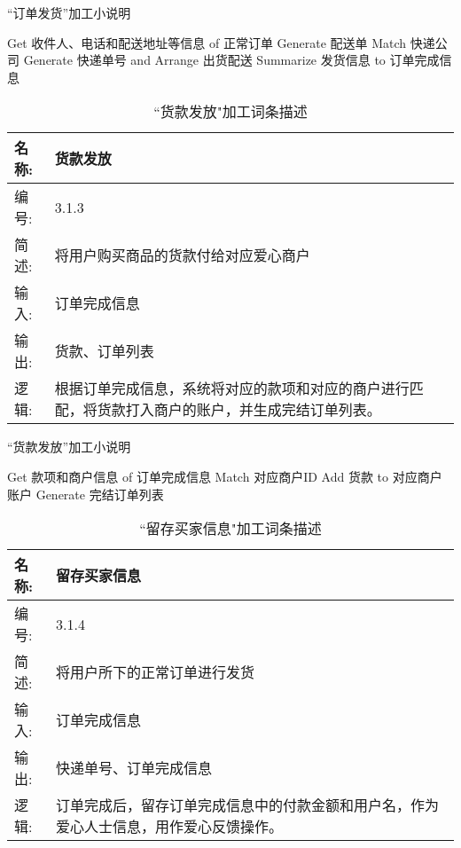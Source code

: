 \begin{algorithm}[H]
    \renewcommand{\thealgorithm}{}
    \caption{“订单发货”加工小说明} 
    \label{alg3} 
    \begin{algorithmic}[1] 
        \STATE Get 收件人、电话和配送地址等信息 of 正常订单
        \STATE Generate 配送单
        \STATE Match 快递公司
        \STATE Generate 快递单号 and Arrange 出货配送
        \STATE Summarize 发货信息 to 订单完成信息 
    \end{algorithmic} 
\end{algorithm}

\begin{table}[H]  
\caption{``货款发放"加工词条描述}  
\begin{center}  
    \begin{tabular}{l p{11cm}} 
        \hline
        \quad 名称:  &   货款发放 \\
        \hline
        \quad 编号:  & 3.1.3 \\
        \hline
        \quad 简述:  & 将用户购买商品的货款付给对应爱心商户 \\
        \hline
        \quad 输入:  & 订单完成信息 \\
        \hline
        \quad 输出:  & 货款、订单列表 \\
        \hline
        \quad 逻辑:  & 根据订单完成信息，系统将对应的款项和对应的商户进行匹配，将货款打入商户的账户，并生成完结订单列表。 \\
        \hline
    \end{tabular}
    \label{tab1}
\end{center}
\end{table}


\begin{algorithm}[H]
    \renewcommand{\thealgorithm}{}
    \caption{“货款发放”加工小说明} 
    \label{alg3} 
    \begin{algorithmic}[1] 
        \STATE Get 款项和商户信息 of 订单完成信息
        \STATE Match 对应商户ID
        \STATE Add 货款 to 对应商户账户
        \STATE Generate 完结订单列表
    \end{algorithmic} 
\end{algorithm}

\begin{table}[H]  
\caption{``留存买家信息"加工词条描述}  
\begin{center}  
    \begin{tabular}{l p{11cm}} 
        \hline
        \quad 名称:  &   留存买家信息 \\
        \hline
        \quad 编号:  & 3.1.4 \\
        \hline
        \quad 简述:  & 将用户所下的正常订单进行发货 \\
        \hline
        \quad 输入:  & 订单完成信息 \\
        \hline
        \quad 输出:  & 快递单号、订单完成信息 \\
        \hline
        \quad 逻辑:  & 订单完成后，留存订单完成信息中的付款金额和用户名，作为爱心人士信息，用作爱心反馈操作。 \\
        \hline
    \end{tabular}
    \label{tab1}
\end{center}
\end{table}

